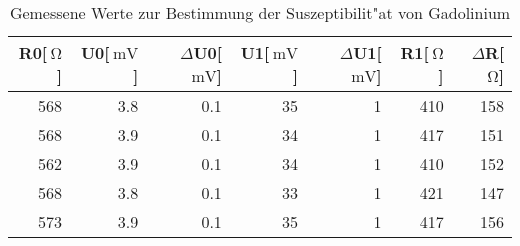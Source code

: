 
\begin{table}[!h]
\begin{center}
\begin{tabular}{|r|r|r|r|r|r|r|}
\hline
R0[$\SI{}{\ohm}$] & U0[$\SI{}{\milli\volt}$] & $\Delta$U0[$\SI{}{\milli\volt}$] & U1[$\SI{}{\milli\volt}$] & $\Delta$U1[$\SI{}{\milli\volt}$] & R1[$\SI{}{\ohm}$] & $\Delta$R[$\SI{}{\ohm}$]\\
\hline
\hline

568 & 3.8 &	0.1 & 35 & 1 & 410 & 158 \\
568 & 3.9 &	0.1 & 34 & 1 & 417 & 151 \\
562 & 3.9 &	0.1 & 34 & 1 & 410 & 152 \\
568 & 3.8 &	0.1 & 33 & 1 & 421 & 147 \\
573 & 3.9 &	0.1 & 35 & 1 & 417 & 156 \\

\hline
\end{tabular}
\caption[Messwerte zu Aufgabenteil b]{Gemessene Werte zur Bestimmung der Suszeptibilit"at von Gadolinium}
\label{tabelle:aufgabe_b_Gd}
\end{center}
\end{table}